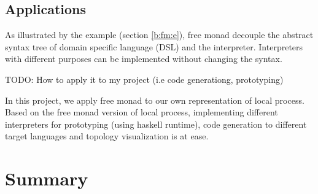\subsection{Applications} \label{b:fm:a}
As illustrated by the example (section \ref{b:fm:e}), free monad decouple the abstract syntax tree of domain specific language (DSL) and the interpreter. Interpreters with different purposes can be implemented without changing the syntax.

TODO: How to apply it to my project (i.e code generationg, prototyping)

In this project, we apply free monad to our own representation of local process. Based on the free monad version of local process, implementing different interpreters for prototyping (using haskell runtime), code generation to different target languages and topology visualization is at ease.
\section{Summary}